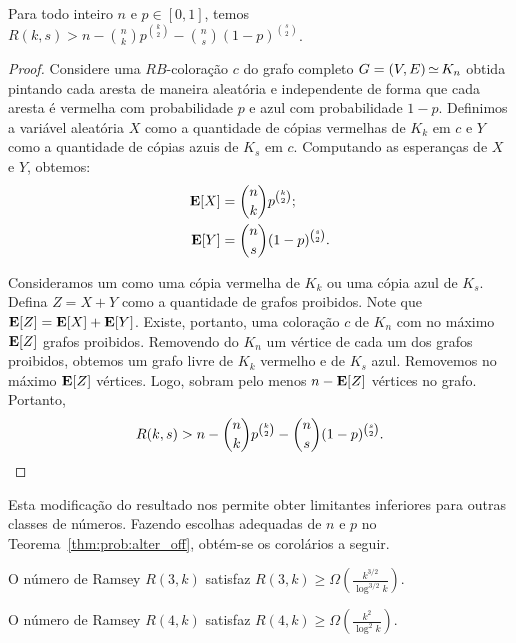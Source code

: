 \begin{theorem}
\label{thm:prob:alter_off}
Para todo inteiro $n$ e $p \in [0,1]$, temos $\displaystyle R(k, s) > n - \binom{n}{k}p^{\binom{k}{2}} - \binom{n}{s}(1-p)^{\binom{s}{2}}$.
\end{theorem}
\begin{proof}
Considere uma $RB$-coloração $c$ do grafo completo $G = (V,E) \operatorname{\simeq} K_n$ obtida pintando cada aresta de maneira aleatória e independente de forma que cada aresta é vermelha com probabilidade $p$ e azul com probabilidade $1-p$.
Definimos a variável aleatória $X$ como a quantidade de cópias vermelhas de $K_k$ em $c$ e $Y$ como a quantidade de cópias azuis de $K_s$ em $c$. Computando as esperanças de $X$ e $Y$, obtemos:
\begin{align*}
\operatorname{\mathbf{E}}[X] &= \binom{n}{k}p^{\binom{k}{2}}; \\
\operatorname{\mathbf{E}}[Y] &= \binom{n}{s}(1-p)^{\binom{s}{2}}.
\end{align*}

Consideramos um  como uma cópia vermelha de $K_k$ ou uma cópia azul de $K_s$. Defina $Z = X + Y$ como a quantidade de grafos proibidos. Note que $\operatorname{\mathbf{E}}[Z] = \operatorname{\mathbf{E}}[X] + \operatorname{\mathbf{E}}[Y]$. Existe, portanto, uma coloração $c$ de $K_n$ com no máximo $\operatorname{\mathbf{E}}[Z]$ grafos proibidos. Removendo do $K_n$ um vértice de cada um dos grafos proibidos, obtemos um grafo livre de $K_k$ vermelho e de $K_s$ azul. Removemos no máximo $\operatorname{\mathbf{E}}[Z]$ vértices. Logo, sobram pelo menos $n - \operatorname{\mathbf{E}}[Z] $ vértices no grafo. Portanto,
\[ R(k, s) > n - \binom{n}{k}p^{\binom{k}{2}} - \binom{n}{s}(1-p)^{\binom{s}{2}}.  \qedhere\]
\end{proof}

Esta modificação do resultado nos permite obter limitantes inferiores para outras classes de números. Fazendo escolhas adequadas de $n$ e $p$ no Teorema~\ref{thm:prob:alter_off}, obtém-se os corolários a seguir.

\begin{noproofcorollary}
O número de Ramsey $R(3,k)$ satisfaz $\displaystyle R(3,k) \geq  \Omega\left( \frac{k^{3/2}}{\log^{3/2} k}\right)$.
\end{noproofcorollary}

\begin{noproofcorollary}
O número de Ramsey $R(4,k)$ satisfaz $\displaystyle R(4,k) \geq  \Omega\left( \frac{k^2}{\log^2 k}\right)$.
\end{noproofcorollary}

